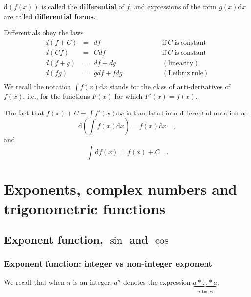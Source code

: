 \documentclass[12pt]{book}
\newcommand{\diff}{\text{d}}
\newcommand{\importantFormula}[1]{\begin{equation} \boxed{#1} \end{equation}}
\renewcommand{\emph}{\textbf}
\begin{document}
$\diff (f(x))$ is called the \emph{differential} of $f$, and expressions of the form $g(x)\diff x$ are called \emph{differential forms}.

Differentials obey the laws
\[
\begin{array}{rcll}
d(f+C)&=&df \quad \quad &\mathrm{if~} C \mathrm{~is~constant}\\
d(Cf)&=&Cdf \quad \quad &\mathrm{if~} C \mathrm{~is~constant}\\
d(f+g)&=&df+dg \quad\quad\quad\quad \quad &(\mathrm{linearity})\\
d(fg)&=&gdf+fdg \quad\quad\quad\quad \quad &(\mathrm{Leibniz~rule})\\
\end{array}
\]
We recall the notation $\displaystyle \int f(x)\diff x$ stands for the class of anti-derivatives of $f(x)$, i.e., for the functions $F(x)$ for which $F'(x) = f(x)$.

The fact that $f(x)+C=\displaystyle \int f'(x)\diff x$ is translated into differential notation as 
\importantFormula{
\displaystyle \diff \left(\int f(x)\diff x\right)= f(x)\diff x\quad ,
}
and
\importantFormula{
\int \diff f(x)= f(x)+C\quad .
}



\chapter{Exponents, complex numbers and trigonometric functions}

\section{Exponent function, $\sin$ and $\cos$}
\subsection{Exponent function: integer vs non-integer exponent}
We recall that when $n$ is an integer,  $a^{n}$ denotes the expression $\underbrace{a*\dots *a}_{n\text{ times}}$. 
\end{document}
